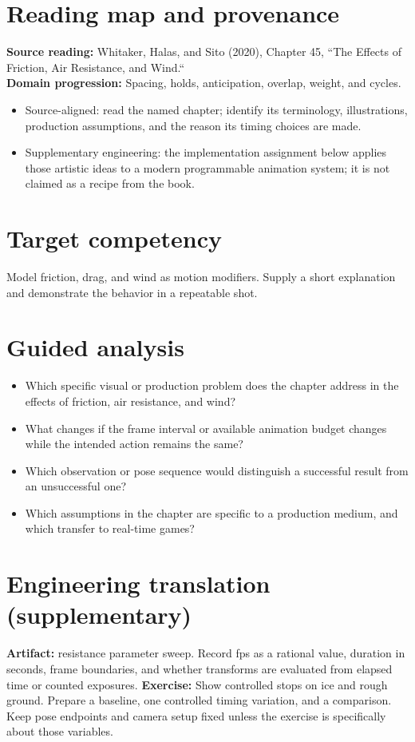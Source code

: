 \documentclass[10pt,letterpaper]{article}
\begin{document}
\makedoctitle
\makedocsummary

\section{Reading map and provenance}
\textbf{Source reading:} Whitaker, Halas, and Sito (2020), Chapter 45, ``The Effects of Friction, Air Resistance, and Wind.``\\
\textbf{Domain progression:} Spacing, holds, anticipation, overlap, weight, and cycles.
\begin{itemize}
\item Source-aligned: read the named chapter; identify its terminology, illustrations, production assumptions, and the reason its timing choices are made.
\item Supplementary engineering: the implementation assignment below applies those artistic ideas to a modern programmable animation system; it is not claimed as a recipe from the book.
\end{itemize}
\section{Target competency}
Model friction, drag, and wind as motion modifiers. Supply a short explanation and demonstrate the behavior in a repeatable shot.
\section{Guided analysis}
\begin{itemize}
\item Which specific visual or production problem does the chapter address in the effects of friction, air resistance, and wind?
\item What changes if the frame interval or available animation budget changes while the intended action remains the same?
\item Which observation or pose sequence would distinguish a successful result from an unsuccessful one?
\item Which assumptions in the chapter are specific to a production medium, and which transfer to real-time games?
\end{itemize}
\section{Engineering translation (supplementary)}
\textbf{Artifact:} resistance parameter sweep. Record fps as a rational value, duration in seconds, frame boundaries, and whether transforms are evaluated from elapsed time or counted exposures.
\textbf{Exercise:} Show controlled stops on ice and rough ground. Prepare a baseline, one controlled timing variation, and a comparison. Keep pose endpoints and camera setup fixed unless the exercise is specifically about those variables.
\end{document}
